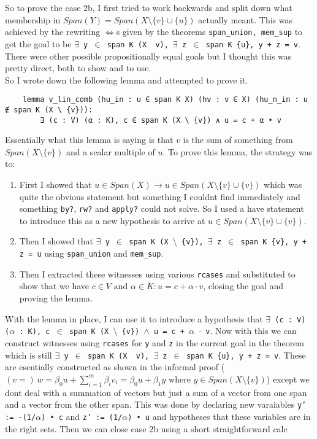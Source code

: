 \documentclass{article}
\begin{document}
So to prove the case 2b, I first tried to work backwards and split down what membership in \(Span(Y) = Span(X \setminus \{v\} \cup \{u\})\) actually meant. This was achieved by the rewriting \(\iff\)s given by the theorems \texttt{span\_union, mem\_sup} to get the goal to be \texttt{$\exists$ y $\in$ span K (X \ {v}), $\exists$ z $\in$ span K \{u\}, y + z = v}. There were other possible propositionally equal goals but I thought this was pretty direct, both to show and to use. \\

So I wrote down the following lemma and attempted to prove it.
\begin{lstlisting}
    lemma v_lin_comb (hu_in : u ∈ span K X) (hv : v ∈ X) (hu_n_in : u ∉ span K (X \ {v})):
        ∃ (c : V) (α : K), c ∈ span K (X \ {v}) ∧ u = c + α • v
\end{lstlisting}

Essentially what this lemma is saying is that \(v\) is the sum of something from \(Span(X \setminus \{v\})\) and a scalar multiple of \(u\). To prove this lemma, the strategy was to:

\begin{enumerate}
    \item First I showed that \(u \in Span (X) \to u \in Span(X \setminus \{v\} \cup \{v\})\) which was quite the obvious statement but something I couldnt find immediately and something \texttt{by?}, \texttt{rw?} and \texttt{apply?} could not solve. So I used a have statement to introduce this as a new hypothesis to arrive at \(u \in Span(X \setminus \{v\} \cup \{v\})\).
    \item Then I showed that \texttt{$\exists$ y $\in$ span K (X $\setminus$ \{v\}), $\exists$ z $\in$ span K \{v\}, y + z = u} using \texttt{span\_union} and \texttt{mem\_sup}.
    \item Then I extracted these witnesses using various \texttt{rcases} and substituted to show that we have \(c \in V \text{ and } \alpha \in K:u=c + \alpha\cdot v\), closing the goal and proving the lemma.
\end{enumerate}

With the lemma in place, I can use it to introduce a hypothesis that \texttt{$\exists$ (c : V) ($\alpha$ : K), c $\in$ span K (X $\setminus$ \{v\}) $\land$ u = c + $\alpha$ $\cdot$ v}. Now with this we can construct witnesses using \texttt{rcases} for \texttt{y} and \texttt{z} in the current goal in the theorem which is still \texttt{$\exists$ y $\in$ span K (X \ {v}), $\exists$ z $\in$ span K \{u\}, y + z = v}. These are esentially constructed as shown in the informal proof (\((v=)\,w  = \beta_0 u + \sum_{i=1}^m \beta_i v_i = \beta_0 u + \beta_1y\) where \(y \in Span(X \setminus\{v\}) \)) except we dont deal with a summation of vectors but just a sum of a vector from one span and a vector from the other span. This was done by declaring new varaiables \texttt{y' := -(1/$\alpha$) • c} and \texttt{z' := (1/$\alpha$) • u} and hypotheses that these variables are in the right sets. Then we can close case 2b using a short straightforward calc
\end{document}
